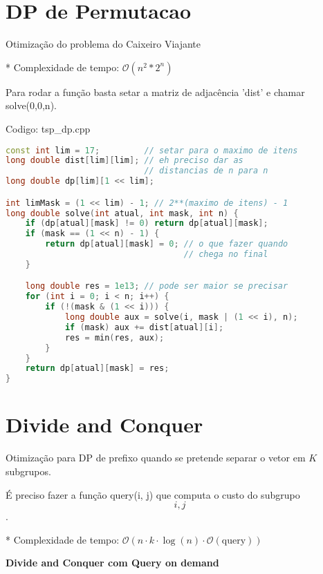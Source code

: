 \documentclass[10pt, a4paper, oneside]{book}
\begin{document}
\section{DP de Permutacao}


Otimização do problema do Caixeiro Viajante



* Complexidade de tempo: $\mathcal{O}(n^2 * 2^n)$



Para rodar a função basta setar a matriz de adjacência 'dist' e chamar solve(0,0,n).

\hfill

Codigo: tsp\_dp.cpp

\begin{lstlisting}[language=C++]
const int lim = 17;         // setar para o maximo de itens
long double dist[lim][lim]; // eh preciso dar as
                            // distancias de n para n
long double dp[lim][1 << lim];

int limMask = (1 << lim) - 1; // 2**(maximo de itens) - 1
long double solve(int atual, int mask, int n) {
    if (dp[atual][mask] != 0) return dp[atual][mask];
    if (mask == (1 << n) - 1) {
        return dp[atual][mask] = 0; // o que fazer quando
                                    // chega no final
    }

    long double res = 1e13; // pode ser maior se precisar
    for (int i = 0; i < n; i++) {
        if (!(mask & (1 << i))) {
            long double aux = solve(i, mask | (1 << i), n);
            if (mask) aux += dist[atual][i];
            res = min(res, aux);
        }
    }
    return dp[atual][mask] = res;
}
\end{lstlisting}
\hfill

\section{Divide and Conquer}


Otimização para DP de prefixo quando se pretende separar o vetor em \(K\) subgrupos.    



É preciso fazer a função query(i, j) que computa o custo do subgrupo \[i, j\].

* Complexidade de tempo: $\mathcal{O}(n \cdot k \cdot \log(n) \cdot  \mathcal{O}(\text{query}))$



\textbf{Divide and Conquer com Query on demand} 
\end{document}
